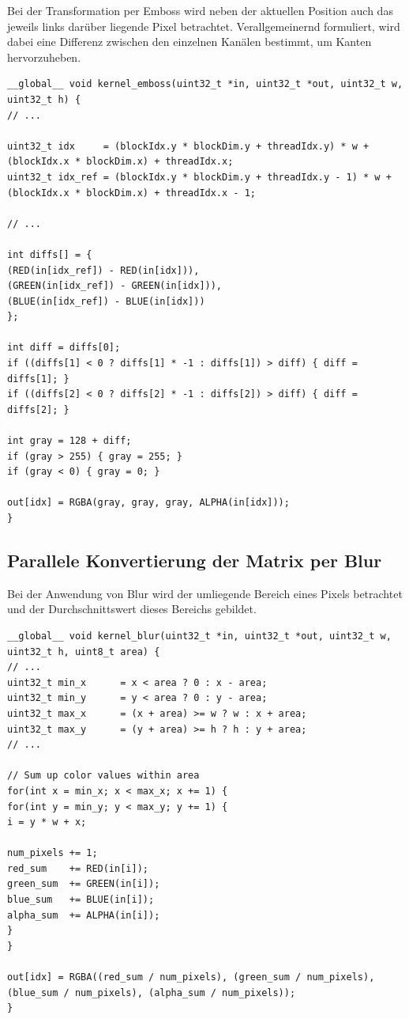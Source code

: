 \documentclass{llncs}
\begin{document}
Bei der Transformation per Emboss wird neben der aktuellen Position auch das jeweils links darüber liegende Pixel betrachtet. Verallgemeinernd formuliert, wird dabei eine Differenz zwischen den einzelnen Kanälen bestimmt, um Kanten hervorzuheben.

\begin{lstlisting}
__global__ void kernel_emboss(uint32_t *in, uint32_t *out, uint32_t w, uint32_t h) {
// ...

uint32_t idx     = (blockIdx.y * blockDim.y + threadIdx.y) * w + (blockIdx.x * blockDim.x) + threadIdx.x;
uint32_t idx_ref = (blockIdx.y * blockDim.y + threadIdx.y - 1) * w + (blockIdx.x * blockDim.x) + threadIdx.x - 1;

// ...

int diffs[] = {
(RED(in[idx_ref]) - RED(in[idx])),
(GREEN(in[idx_ref]) - GREEN(in[idx])),
(BLUE(in[idx_ref]) - BLUE(in[idx]))
};

int diff = diffs[0];
if ((diffs[1] < 0 ? diffs[1] * -1 : diffs[1]) > diff) { diff = diffs[1]; }
if ((diffs[2] < 0 ? diffs[2] * -1 : diffs[2]) > diff) { diff = diffs[2]; }

int gray = 128 + diff;
if (gray > 255) { gray = 255; }
if (gray < 0) { gray = 0; }

out[idx] = RGBA(gray, gray, gray, ALPHA(in[idx]));
}
\end{lstlisting}
\newpage
%
\subsection{Parallele Konvertierung der Matrix per Blur}
%
Bei der Anwendung von Blur wird der umliegende Bereich eines Pixels betrachtet und der Durchschnittswert dieses Bereichs gebildet.

\begin{lstlisting}
__global__ void kernel_blur(uint32_t *in, uint32_t *out, uint32_t w, uint32_t h, uint8_t area) {
// ...
uint32_t min_x      = x < area ? 0 : x - area;
uint32_t min_y      = y < area ? 0 : y - area;
uint32_t max_x      = (x + area) >= w ? w : x + area;
uint32_t max_y      = (y + area) >= h ? h : y + area;
// ...

// Sum up color values within area
for(int x = min_x; x < max_x; x += 1) {
for(int y = min_y; y < max_y; y += 1) {
i = y * w + x;

num_pixels += 1;
red_sum    += RED(in[i]);
green_sum  += GREEN(in[i]);
blue_sum   += BLUE(in[i]);
alpha_sum  += ALPHA(in[i]);
}
}

out[idx] = RGBA((red_sum / num_pixels), (green_sum / num_pixels), (blue_sum / num_pixels), (alpha_sum / num_pixels));
}
\end{lstlisting}
\newpage
%
\end{document}
